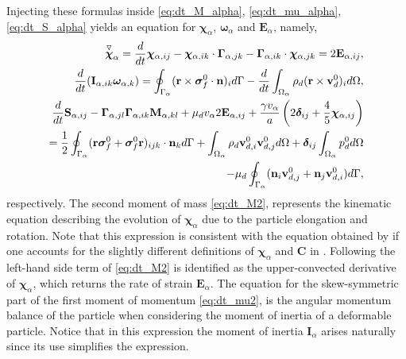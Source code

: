 Injecting these formulas inside \ref{eq:dt_M_alpha}, \ref{eq:dt_mu_alpha}, \ref{eq:dt_S_alpha} yields an equation for $\bm\chi_\alpha$, $\bm\omega_\alpha$ and $\textbf{E}_\alpha$, namely,
\begin{align}
    \overset{ \triangledown  }{\bm\chi}_\alpha
    = 
    \ddt \bm\chi_{\alpha,ij}
    -\bm\chi_{\alpha,ik} \cdot \bm\Gamma_{\alpha,jk}
    - \bm\Gamma_{\alpha,ik} \cdot \bm\chi_{\alpha,jk}
    =
    2\textbf{E}_{\alpha,ij},
    \label{eq:dt_M2}
    \\
    \ddt (\textbf{I}_{\alpha,ik}\bm\omega_{\alpha,k} )
    = 
    \intS{(\textbf{r}\times\bm\sigma_f^0\cdot \textbf{n})_i}
    - \ddt\intO{\rho_d(\textbf{r}\times \textbf{v}_d^0)_i},
    \label{eq:dt_mu2}
    \\
    \ddt \textbf{S}_{\alpha,ij}
    -  \bm\Gamma_{\alpha,jl}\bm\Gamma_{\alpha,ik} \textbf{M}_{\alpha,kl}  
    + \mu_d v_\alpha 2\textbf{E}_{\alpha,ij}
    + \frac{\gamma v_\alpha }{a} \left(
    2\bm\delta_{ij} 
    + \frac{4 }{5} \bm\chi_{\alpha,ij}
    \right) \nonumber\\
    = 
    \frac{1}{2}\intS{(\textbf{r}\bm\sigma_f^0 + \bm\sigma_f^0\textbf{r})_{ijk}\cdot \textbf{n}_k} 
    + \intO{\rho_d \textbf{v}_{d,i}^0\textbf{v}_{d,j}^0}
    + \bm\delta_{ij}\intO{p_d^0} \nonumber\\
    - \mu_d \intS{(\textbf{n}_i \textbf{v}_{d,j}^0 + \textbf{n}_j \textbf{v}_{d,i}^0)},
    \label{eq:dt_S2}
\end{align}
respectively. 
The second moment of mass \ref{eq:dt_M2}, represents the kinematic equation describing the evolution of $\bm\chi_\alpha$ due to the particle elongation and rotation. 
Note that this expression is consistent with the equation obtained by \citet{goddard1967nonlinear} if one accounts for the slightly different definitions of $\bm\chi_\alpha$ and \textbf{C} in \citet{goddard1967nonlinear}.
Following \citet{goddard1967nonlinear} the left-hand side term of \ref{eq:dt_M2} is identified as the upper-convected derivative of $\bm\chi_\alpha$, which returns the rate of strain $\textbf{E}_\alpha$. 
The equation for the skew-symmetric part of the first moment of momentum \ref{eq:dt_mu2}, is the angular momentum balance of the particle when considering the moment of inertia of a deformable particle.
Notice that in this expression the moment of inertia $\textbf{I}_\alpha$ arises naturally since its use simplifies the expression. 
